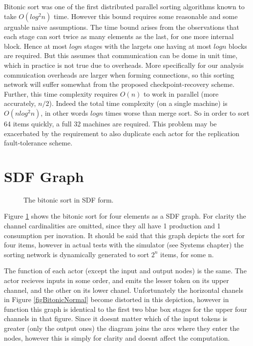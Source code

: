 Bitonic sort was one of the first distributed parallel sorting algorithms known to take $O(log^2 n)$ time.
However this bound requires some reasonable and some arguable naive assumptions.
The time bound arises from the observations that each stage can sort twice as many elements as the last, for one more internal block.
Hence at most $log n$ stages with the largets one having at most $log n$ blocks are required.
But this assumes that communication can be dome in unit time, which in practice is not true due to overheads.
More specifically for our analysis commuication overheads are larger when forming connections, so this sorting network will suffer somewhat from the proposed checkpoint-recovery scheme.
Further, this time complexity requires $O(n)$ to work in parallel (more accurately, $n/2$).
Indeed the total time complexity (on a single machine) is $O(n log^2 n)$, in other words $log n$ times worse than merge sort.
So in order to sort 64 items quickly, a full 32 machines are required.
This problem may be exacerbated by the requirement to also duplicate each actor for the replication fault-tolerance scheme.

\section{SDF Graph}

\begin{figure}
\begin{center}
	
\caption{The bitonic sort in SDF form.}
\label{figBitonicGraph}
\end{center}
\end{figure}

Figure \ref{figBitonicGraph} shows the bitonic sort for four elements as a SDF graph.
For clarity the channel cardinalities are omitted, since they all have 1 production and 1 consumption per inovation.
It should be said that this graph depicts the sort for four items, however in actual tests with the simulator (see Systems chapter) the sorting network is dynamically generated to sort $2^n$ items, for some n.

The function of each actor (except the input and output nodes) is the same.
The actor recieves inputs in some order, and emits the lesser token on its upper channel, and the other on its lower chanel.
Unfortunately the horizontal chanels in Figure \ref{figBitonicNormal} become distorted in this depiction, however in function this graph is identical to the first two blue box stages for the upper four channels in that figure.
Since it doesnt matter which of the input tokens is greater (only the output ones) the diagram joins the arcs where they enter the nodes, however this is simply for clarity and doesnt affect the computation.

